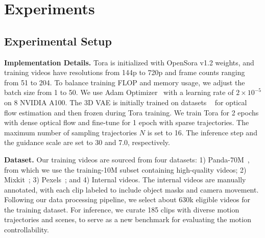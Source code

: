 
\section{Experiments}

\subsection{Experimental Setup}
\noindent \textbf{Implementation Details.} Tora is initialized with OpenSora v1.2 weights, and training videos have resolutions from 144p to 720p and frame counts ranging from 51 to 204. To balance training FLOP and memory usage, we adjust the batch size from 1 to 50. We use Adam Optimizer~\cite{DBLP:journals/corr/KingmaB14} with a learning rate of $2\times10^{-5}$ on 8 NVIDIA A100. The 3D VAE is initially trained on datasets ~\cite{DBLP:conf/cvpr/MehlSJNB23,DBLP:conf/cvpr/MayerIHFCDB16,DBLP:journals/ijcv/RanjanHTTRB20,DBLP:journals/corr/abs-2001-10773} for optical flow estimation and then frozen during Tora training. We train Tora for 2 epochs with dense optical flow and fine-tune for 1 epoch with sparse trajectories. The maximum number of sampling trajectories $N$ is set to 16. The inference step and the guidance scale are set to 30 and 7.0, respectively.

\noindent \textbf{Dataset.} Our training videos are sourced from four datasets: 1) Panda-70M~\cite{DBLP:journals/corr/abs-2402-19479}, from which we use the training-10M subset containing high-quality videos; 2) Mixkit~\cite{mixkit}; 3) Pexels~\cite{pexel}; and 4) Internal videos. The internal videos are manually annotated, with each clip labeled to include object masks and camera movement. Following our data processing pipeline, we select about 630k eligible videos for the training dataset. For inference, we curate 185 clips with diverse motion trajectories and scenes, to serve as a new benchmark for evaluating the motion controllability. 

